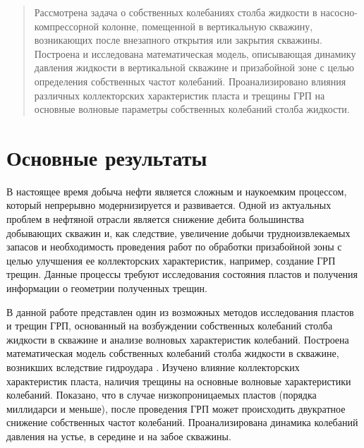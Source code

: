 \maketitle

\begin{abstract}
 Рассмотрена задача о собственных колебаниях столба жидкости в насосно-комп\-рес\-сор\-ной колонне, помещенной в вертикальную скважину, возникающих после внезапного открытия или закрытия скважины. Построена и исследована математическая модель, описывающая динамику давления жидкости в вертикальной скважине и призабойной зоне с целью определения собственных частот колебаний. Проанализировано влияния различных коллекторских характеристик пласта и трещины ГРП на основные волновые параметры собственных колебаний столба жидкости.  
\end{abstract}

\section{Основные результаты} %

В настоящее время добыча нефти является сложным и наукоемким процессом, который непрерывно модернизируется и развивается. Одной из актуальных проблем в нефтяной отрасли является снижение дебита большинства добывающих скважин и, как следствие, увеличение добычи трудноизвлекаемых запасов и необходимость проведения работ по обработки призабойной зоны с целью улучшения ее коллекторских характеристик, например, создание ГРП трещин. Данные процессы требуют исследования состояния пластов и получения информации о геометрии полученных трещин. 

В данной работе представлен один из возможных методов исследования пластов и трещин ГРП, основанный на возбуждении собственных колебаний столба жидкости в скважине и анализе волновых характеристик колебаний. Построена математическая модель собственных колебаний столба жидкости в скважине, возникших вследствие гидроудара  \cite{1,2}. Изучено влияние коллекторских характеристик пласта, наличия трещины на основные волновые характеристики колебаний. Показано, что в случае низкопроницаемых пластов (порядка миллидарси и меньше), после проведения ГРП может происходить двукратное снижение собственных частот колебаний. Проанализирована динамика колебаний давления на устье, в середине и на забое скважины.  


